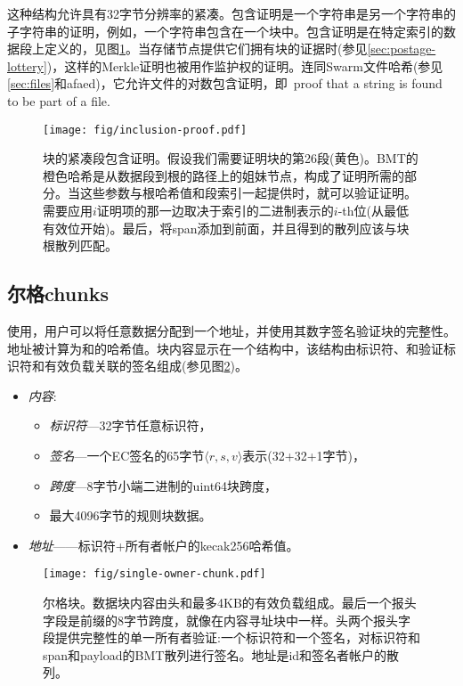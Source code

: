 这种结构允许具有32字节分辨率的紧凑。包含证明是一个字符串是另一个字符串的子字符串的证明，例如，一个字符串包含在一个块中。包含证明是在特定索引的数据段上定义的，见图\ref{fig:chunk-inclusion}。当存储节点提供它们拥有块的证据时(参见\ref{sec:postage-lottery})，这样的Merkle证明也被用作监护权的证明。连同Swarm文件哈希(参见\ref{sec:files}和afaed)，它允许文件的对数包含证明，即\ proof that a string is found to be part of a file.\begin{figure}[htbp]
\centering
\texttt{[image: fig/inclusion-proof.pdf]}
\caption[块的紧凑段包含证明\statusgreen]{块的紧凑段包含证明。假设我们需要证明块的第26段(黄色)。BMT的橙色哈希是从数据段到根的路径上的姐妹节点，构成了证明所需的部分。当这些参数与根哈希值和段索引一起提供时，就可以验证证明。需要应用$i$证明项的那一边取决于索引的二进制表示的$i$-th位(从最低有效位开始)。最后，将span添加到前面，并且得到的散列应该与块根散列匹配。}
\label{fig:chunk-inclusion}
\end{figure}


\subsection{尔格chunks\statusgreen}\label{sec:single-owner-chunks}

使用，用户可以将任意数据分配到一个地址，并使用其数字签名验证块的完整性。地址被计算为和的哈希值。块内容显示在一个结构中，该结构由标识符、和验证标识符和有效负载关联的签名组成(参见图\ref{fig:single-owner-chunks})。

\begin{itemize}
    \item \emph{内容}:
\begin{itemize}
    \item \emph{标识符}—32字节任意标识符， 
    \item \emph{签名}—一个EC签名的65字节$\langle r,s,v \rangle$表示(32+32+1字节)，
    \item \emph{跨度}—8字节小端二进制的uint64块跨度，
    \item 最大4096字节的规则块数据。
\end{itemize}
    \item \emph{地址}——标识符+所有者帐户的kecak256哈希值。
\end{itemize}

\begin{figure}[htbp]
   \centering
   \texttt{[image: fig/single-owner-chunk.pdf]}
   \caption[尔格chunk\statusgreen]{尔格块。数据块内容由头和最多4KB的有效负载组成。最后一个报头字段是前缀的8字节跨度，就像在内容寻址块中一样。头两个报头字段提供完整性的单一所有者验证:一个标识符和一个签名，对标识符和span和payload的BMT散列进行签名。地址是id和签名者帐户的散列。}
   \label{fig:single-owner-chunks}
\end{figure}

